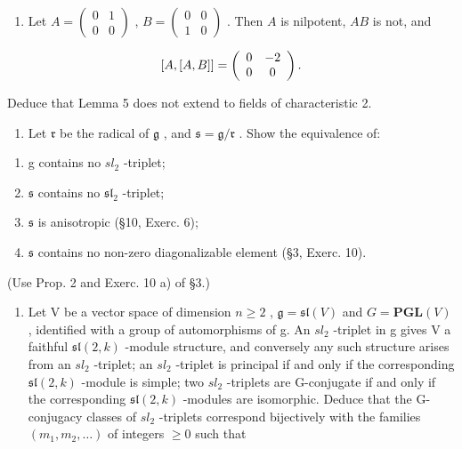 \begin{enumerate}
\def\labelenumi{\arabic{enumi})}
\setcounter{enumi}{1}
\tightlist
\item
  Let \(A = \begin{pmatrix} 0 & 1 \\ 0 & 0 \end{pmatrix}\) , \(B = \begin{pmatrix} 0 & 0 \\ 1 & 0 \end{pmatrix}\) . Then \(A\) is nilpotent, \(AB\) is not, and
\end{enumerate}

\[
[ A, [ A, B ] ] = \left( \begin{array}{c c} 0 & - 2 \\ 0 & 0 \end{array} \right).
\]

Deduce that Lemma 5 does not extend to fields of characteristic 2.

\begin{enumerate}
\def\labelenumi{\arabic{enumi})}
\setcounter{enumi}{2}
\tightlist
\item
  Let \(\mathfrak{r}\) be the radical of \(\mathfrak{g}\) , and \(\mathfrak{s} = \mathfrak{g} / \mathfrak{r}\) . Show the equivalence of:
\end{enumerate}

\begin{enumerate}
\def\labelenumi{(\roman{enumi})}
\item
  g contains no \(sl_{2}\) -triplet;
\item
  \(\mathfrak{s}\) contains no \(\mathfrak{sl}_2\) -triplet;
\item
  \(\mathfrak{s}\) is anisotropic (§10, Exerc. 6);
\item
  \(\mathfrak{s}\) contains no non-zero diagonalizable element (§3, Exerc. 10).
\end{enumerate}

(Use Prop. 2 and Exerc. 10 a) of §3.)

\begin{enumerate}
\def\labelenumi{\arabic{enumi})}
\setcounter{enumi}{3}
\tightlist
\item
  Let V be a vector space of dimension \(n \geq 2\) , \(\mathfrak{g} = \mathfrak{sl}(V)\) and \(G = \mathbf{PGL}(V)\) , identified with a group of automorphisms of g. An \(sl_{2}\) -triplet in g gives V a faithful \(\mathfrak{sl}(2, k)\) -module structure, and conversely any such structure arises from an \(sl_{2}\) -triplet; an \(sl_{2}\) -triplet is principal if and only if the corresponding \(\mathfrak{sl}(2, k)\) -module is simple; two \(sl_{2}\) -triplets are G-conjugate if and only if the corresponding \(\mathfrak{sl}(2, k)\) -modules are isomorphic. Deduce that the G-conjugacy classes of \(sl_{2}\) -triplets correspond bijectively with the families \((m_{1}, m_{2}, \ldots)\) of integers \(\geq 0\) such that
\end{enumerate}

